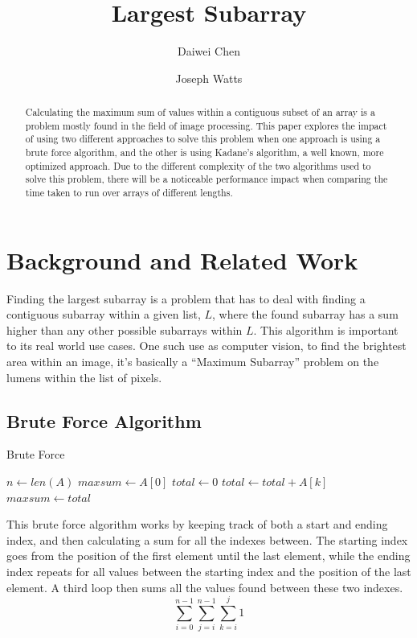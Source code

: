 \documentclass[10pt, letterpaper]{article}
\title{Largest Subarray}
\author{Daiwei Chen \and Joseph Watts}
\begin{document}
	\maketitle
	\begin{abstract}
		Calculating the maximum sum of values within a contiguous subset of an array is a problem mostly found in the field of image processing.
		This paper explores the impact of using two different approaches to solve this problem when one approach is using a brute force algorithm, and the other is using Kadane's algorithm, a well known, more optimized approach.
		Due to the different complexity of the two algorithms used to solve this problem,
		there will be a noticeable performance impact when comparing the time taken to run over arrays of different lengths. 
	\end{abstract}
	\section{Background and Related Work}
  Finding the largest subarray is a problem that has to deal with finding a contiguous subarray within a given list, $L$, where the found subarray has a sum higher than any other possible subarrays within $L$.
  This algorithm is important to its real world use cases. One such use as computer vision, to find the brightest area within an image, it's basically a ``Maximum Subarray'' problem on the lumens within the list of pixels.

	\subsection{Brute Force Algorithm}

	\begin{algorithm}
	\begin{algorithmic}
		\caption{Brute Force}\label{bruteforce}
	\State $n\gets len(A)$
	\State $maxsum\gets A[0]$
	\State $total\gets 0$
	\State $total\gets total + A[k]$
	\EndFor
	\State $maxsum\gets total$
	\EndIf
	\EndFor
	\EndFor
	\EndFunction
	\end{algorithmic}
	\end{algorithm}


	This brute force algorithm works by keeping track of both a start and ending index, and then calculating a sum for all the indexes between.
	The starting index goes from the position of the first element until the last element, while the ending index repeats for all values between the starting index and the position of the last element.
	A third loop then sums all the values found between these two indexes.
	\[\sum_{i = 0}^{n-1}\sum_{j = i}^{n-1}\sum_{k = i}^{j}1\]
\end{document}
